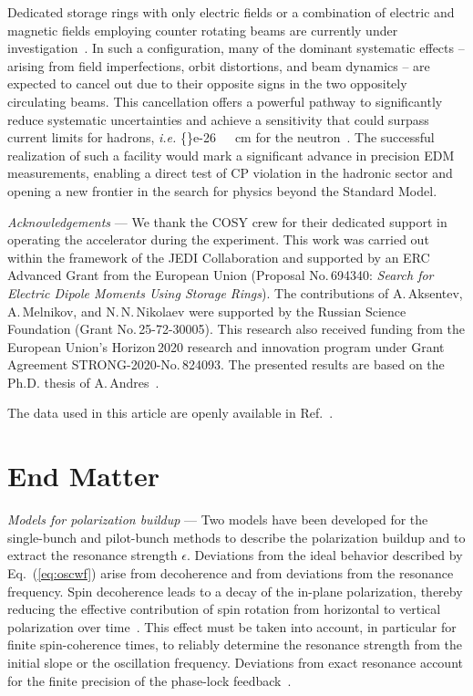 \documentclass[
    10pt,
    twocolumn,
    secnumarabic,
    amssymb,
    nobibnotes,
    aps,
    prl,

    longbibliography,
    superscriptaddress
    ]{revtex4-2}
\begin{document}
Dedicated storage rings with only electric fields or a combination of electric and magnetic fields employing counter rotating beams are currently under investigation~\cite{abusaif2021, Anastassopoulos:2015ura, PhysRevAccelBeams.22.034001}.
In such a configuration, many of the dominant systematic effects -- arising from field imperfections, orbit distortions, and beam dynamics -- are expected to cancel out due to their opposite signs in the two oppositely circulating beams.
This cancellation offers a powerful pathway to significantly reduce systematic uncertainties and achieve a sensitivity that could surpass current limits for hadrons, \emph{i.e.} \SI{{}e-26}{\echarge\cdot cm} for the neutron~\cite{PhysRevLett.124.081803}.
The successful realization of such a facility would mark a significant advance in precision EDM measurements, enabling a direct test of CP violation in the hadronic sector and opening a new frontier in the search for physics beyond the Standard Model.

\textit{Acknowledgements} --- We thank the COSY crew for their dedicated support in operating the accelerator during the experiment. This work was carried out within the framework of the JEDI Collaboration and supported by an ERC Advanced Grant from the European Union (Proposal No.\,694340: \emph{Search for Electric Dipole Moments Using Storage Rings}).
The contributions of A.\,Aksentev, A.\,Melnikov, and N.\,N.\,Nikolaev were supported by the Russian Science Foundation (Grant No.\,25-72-30005).
This research also received funding from the European Union’s Horizon\,2020 research and innovation program under Grant Agreement STRONG-2020-No.\,824093.
The presented results are based on the Ph.D. thesis of A.\,Andres~\cite{Andres:999521}.

The data used in this article are openly available in Ref.~\cite{juelich_data}.







\section{End Matter}
\textit{Models for polarization buildup} ---
Two models have been developed for the single-bunch and pilot-bunch methods to describe the polarization buildup and to extract the resonance strength $\epsilon$. Deviations from the ideal behavior described by Eq.~(\ref{eq:oscwf}) arise from decoherence and from deviations from the resonance frequency.
Spin decoherence leads to a decay of the in-plane polarization, thereby reducing the effective contribution of spin rotation from horizontal to vertical polarization over time~\cite{Hempelmann:718035,PhysRevAccelBeams.27.111002}. This effect must be taken into account, in particular for finite spin-coherence times, to reliably determine the resonance strength from the initial slope or the oscillation frequency. Deviations from exact resonance account for the finite precision of the phase-lock feedback~\cite{PhysRevAccelBeams.28.062801}.
\end{document}
